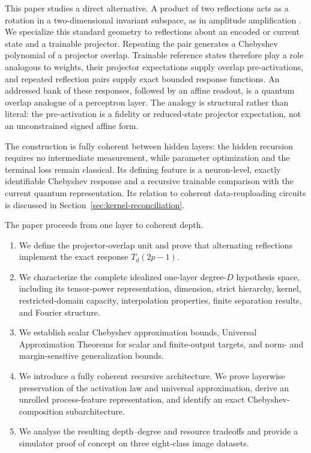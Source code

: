 \documentclass[pdflatex,sn-mathphys,NameDate,iicol]{sn-jnl}
\begin{document}
This paper studies a direct alternative. A product of two reflections acts
as a rotation in a two-dimensional invariant subspace, as in amplitude
amplification \citep{brassard2002amplitude}. We specialize this standard
geometry to reflections about an encoded or current state and a trainable
projector. Repeating the pair generates a Chebyshev polynomial of a
projector overlap. Trainable reference states therefore play a role
analogous to weights, their
projector expectations supply overlap pre-activations, and repeated
reflection pairs supply exact bounded response functions. An addressed
bank of these responses, followed by an affine readout, is a quantum
overlap analogue of a perceptron layer. The analogy is structural rather
than literal: the pre-activation is a fidelity or reduced-state projector
expectation, not an unconstrained signed affine form.

The construction is fully coherent between hidden layers: the hidden
recursion requires no intermediate measurement, while parameter optimization
and the terminal loss remain classical. Its defining feature is a
neuron-level, exactly identifiable Chebyshev response and a recursive
trainable comparison with the current quantum representation. Its relation to
coherent data-reuploading circuits is discussed in
Section~\ref{sec:kernel-reconciliation}.

The paper proceeds from one layer to coherent depth.

\begin{enumerate}[leftmargin=1.5em]
  \item We define the projector-overlap unit and prove that alternating
  reflections implement the exact response $T_d(2p-1)$.

  \item We characterize the complete idealized one-layer degree-$D$
  hypothesis space, including its tensor-power representation, dimension,
  strict hierarchy, kernel, restricted-domain capacity, interpolation
  properties, finite separation results, and Fourier structure.

  \item We establish scalar Chebyshev approximation bounds, Universal
  Approximation Theorems for scalar and finite-output targets, and
  norm- and margin-sensitive generalization bounds.

  \item We introduce a fully coherent recursive architecture. We prove
  layerwise preservation of the activation law and universal approximation,
  derive an unrolled process-feature representation, and identify an exact
  Chebyshev-composition subarchitecture.

  \item We analyse the resulting depth--degree and resource tradeoffs and
  provide a simulator proof of concept on three eight-class image datasets.
\end{enumerate}
\end{document}

